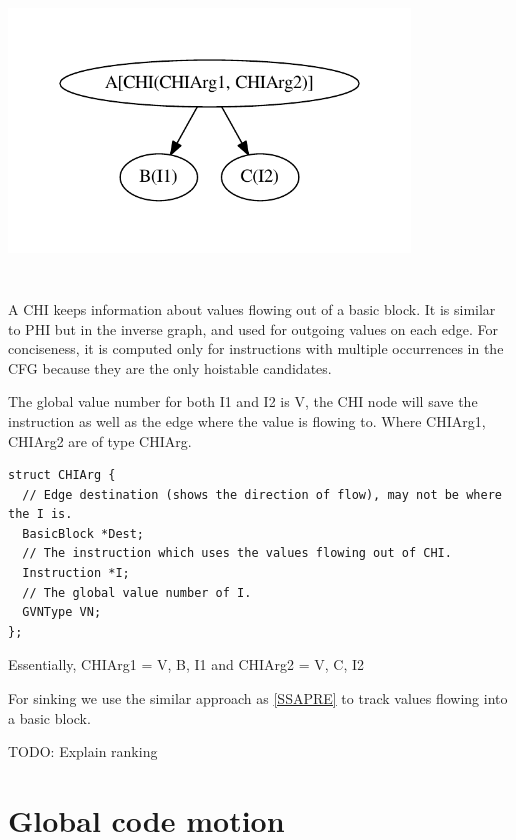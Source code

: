 \documentclass[acmlarge,review,anonymous]{acmart}\settopmatter{printfolios=true}
\begin{document}
\includegraphics[width=0.8\textwidth,height=8cm]{chi-example.pdf}

A CHI keeps information about values flowing out of a basic block.  It is
similar to PHI but in the inverse graph, and used for outgoing values on each
edge. For conciseness, it is computed only for instructions with multiple
occurrences in the CFG because they are the only hoistable candidates.



The global value number for both I1 and I2 is V, the CHI node will save the
instruction as well as the edge where the value is flowing to.  Where CHIArg1,
CHIArg2 are of type CHIArg.

\begin{verbatim}
struct CHIArg {
  // Edge destination (shows the direction of flow), may not be where the I is.
  BasicBlock *Dest;
  // The instruction which uses the values flowing out of CHI.
  Instruction *I;
  // The global value number of I.
  GVNType VN;
};

\end{verbatim}

Essentially, CHIArg1 = {V, B, I1} and CHIArg2 = {V, C, I2}

For sinking we use the similar approach as \ref{SSAPRE} to track values flowing
into a basic block.

TODO: Explain ranking

\section{Global code motion}
\end{document}
